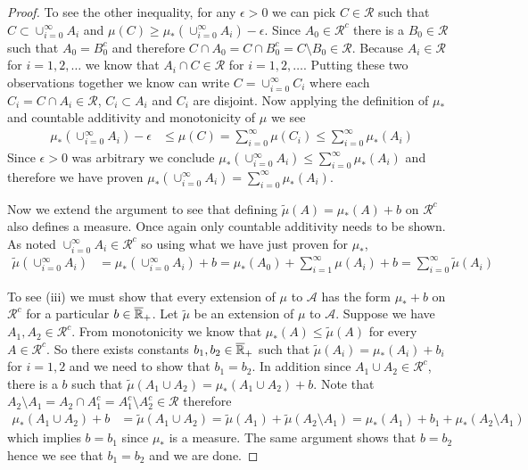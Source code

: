 \begin{proof}
To see the other inequality, for any $\epsilon >0$ we can pick $C \in
\mathcal{R}$ such that $C \subset \cup_{i=0}^\infty A_i$ and $\mu(C)
\geq \mu_*(\cup_{i=0}^\infty A_i) - \epsilon$.  Since $A_0 \in
\mathcal{R}^c$ there is a $B_0 \in \mathcal{R}$ such that $A_0 =
B_0^c$ and therefore $C \cap A_0 = C \cap B_0^c = C\setminus B_0 \in
\mathcal{R}$.  Because $A_i \in \mathcal{R}$ for $i=1,2,\dotsc$ we
know that $A_i \cap C \in \mathcal{R}$ for $i=1,2, \dotsc$.  Putting
these two observations together we know can write $C =
\cup_{i=0}^\infty C_i$ where each $C_i = C \cap A_i \in \mathcal{R}$,
$C_i \subset A_i$ and $C_i$ are disjoint.  Now applying the definition
of $\mu_*$ and countable additivity and monotonicity of $\mu$ we see
\begin{align*}
\mu_*(\cup_{i=0}^\infty A_i) - \epsilon &\leq \mu(C) = \sum_{i=0}^\infty \mu(C_i) \leq \sum_{i=0}^\infty \mu_*(A_i)
\end{align*}
Since $\epsilon > 0$ was arbitrary we conclude
$\mu_*(\cup_{i=0}^\infty A_i)  \leq \sum_{i=0}^\infty
\mu_*(A_i)$ and therefore we have proven $\mu_*(\cup_{i=0}^\infty A_i)  = \sum_{i=0}^\infty
\mu_*(A_i)$.

Now we extend the argument to see that defining $\tilde{\mu}(A) =
\mu_*(A) + b$ on $\mathcal{R}^c$ also defines a measure.  Once again
only countable additivity needs to be shown.  As noted
$\cup_{i=0}^\infty A_i \in \mathcal{R}^c$ so using what we have just
proven for $\mu_*$,
\begin{align*}
\tilde{\mu}(\cup_{i=0}^\infty A_i) &= \mu_*(\cup_{i=0}^\infty A_i ) +
b = \mu_*(A_0) + \sum_{i=1}^\infty \mu(A_i) + b = \sum_{i=0}^\infty \tilde{\mu}(A_i)
\end{align*}

To see (iii) we must show that every extension of $\mu$ to
$\mathcal{A}$ has the form $\mu_* + b$ on $\mathcal{R}^c$ for a particular $b \in
\overline{\mathbb{R}}_+$.  Let $\tilde{\mu}$ be an extension of $\mu$ to
$\mathcal{A}$.  Suppose we have $A_1, A_2 \in
\mathcal{R}^c$.  From monotonicity we know that
$\mu_*(A) \leq \tilde{\mu}(A)$ for every $A\in \mathcal{R}^c$.  So
there exists constants $b_1, b_2 \in \overline{\mathbb{R}}_+$ such that
$\tilde{\mu}(A_i) = \mu_*(A_i) + b_i$ for $i=1,2$ and we need to show
that $b_1 = b_2$.   In addition since $A_1 \cup A_2 \in \mathcal{R}^c$, there is a $b$ such that
$\tilde{\mu}(A_1 \cup A_2) = \mu_*(A_1 \cup A_2) + b$.  Note that $A_2 \setminus A_1 = A_2 \cap A_1^c = A_1^c
\setminus A_2^c \in \mathcal{R}$ therefore
\begin{align*}
\mu_*(A_1 \cup A_2) + b &= \tilde{\mu}(A_1 \cup A_2) =
\tilde{\mu}(A_1) + \tilde{\mu}(A_2 \setminus A_1) = \mu_*(A_1) + b_1 +
\mu_*(A_2 \setminus A_1)
\end{align*}
which implies $b = b_1$ since $\mu_*$ is a measure.  The same argument
shows that $b = b_2$ hence we see that $b_1 = b_2$ and we are done.


\end{proof}
